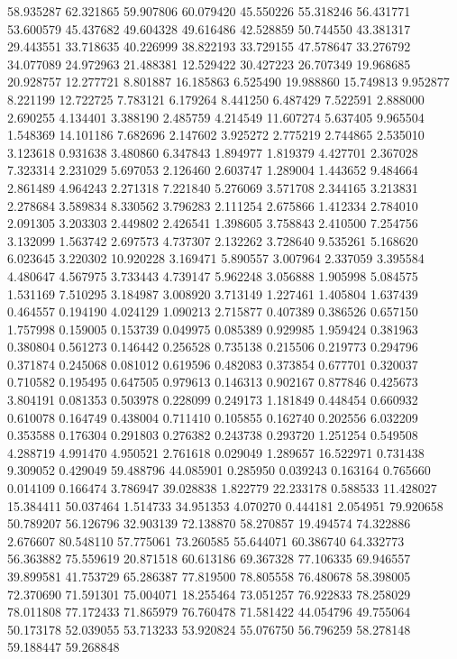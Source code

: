 58.935287
62.321865
59.907806
60.079420
45.550226
55.318246
56.431771
53.600579
45.437682
49.604328
49.616486
42.528859
50.744550
43.381317
29.443551
33.718635
40.226999
38.822193
33.729155
47.578647
33.276792
34.077089
24.972963
21.488381
12.529422
30.427223
26.707349
19.968685
20.928757
12.277721
8.801887
16.185863
6.525490
19.988860
15.749813
9.952877
8.221199
12.722725
7.783121
6.179264
8.441250
6.487429
7.522591
2.888000
2.690255
4.134401
3.388190
2.485759
4.214549
11.607274
5.637405
9.965504
1.548369
14.101186
7.682696
2.147602
3.925272
2.775219
2.744865
2.535010
3.123618
0.931638
3.480860
6.347843
1.894977
1.819379
4.427701
2.367028
7.323314
2.231029
5.697053
2.126460
2.603747
1.289004
1.443652
9.484664
2.861489
4.964243
2.271318
7.221840
5.276069
3.571708
2.344165
3.213831
2.278684
3.589834
8.330562
3.796283
2.111254
2.675866
1.412334
2.784010
2.091305
3.203303
2.449802
2.426541
1.398605
3.758843
2.410500
7.254756
3.132099
1.563742
2.697573
4.737307
2.132262
3.728640
9.535261
5.168620
6.023645
3.220302
10.920228
3.169471
5.890557
3.007964
2.337059
3.395584
4.480647
4.567975
3.733443
4.739147
5.962248
3.056888
1.905998
5.084575
1.531169
7.510295
3.184987
3.008920
3.713149
1.227461
1.405804
1.637439
0.464557
0.194190
4.024129
1.090213
2.715877
0.407389
0.386526
0.657150
1.757998
0.159005
0.153739
0.049975
0.085389
0.929985
1.959424
0.381963
0.380804
0.561273
0.146442
0.256528
0.735138
0.215506
0.219773
0.294796
0.371874
0.245068
0.081012
0.619596
0.482083
0.373854
0.677701
0.320037
0.710582
0.195495
0.647505
0.979613
0.146313
0.902167
0.877846
0.425673
3.804191
0.081353
0.503978
0.228099
0.249173
1.181849
0.448454
0.660932
0.610078
0.164749
0.438004
0.711410
0.105855
0.162740
0.202556
6.032209
0.353588
0.176304
0.291803
0.276382
0.243738
0.293720
1.251254
0.549508
4.288719
4.991470
4.950521
2.761618
0.029049
1.289657
16.522971
0.731438
9.309052
0.429049
59.488796
44.085901
0.285950
0.039243
0.163164
0.765660
0.014109
0.166474
3.786947
39.028838
1.822779
22.233178
0.588533
11.428027
15.384411
50.037464
1.514733
34.951353
4.070270
0.444181
2.054951
79.920658
50.789207
56.126796
32.903139
72.138870
58.270857
19.494574
74.322886
2.676607
80.548110
57.775061
73.260585
55.644071
60.386740
64.332773
56.363882
75.559619
20.871518
60.613186
69.367328
77.106335
69.946557
39.899581
41.753729
65.286387
77.819500
78.805558
76.480678
58.398005
72.370690
71.591301
75.004071
18.255464
73.051257
76.922833
78.258029
78.011808
77.172433
71.865979
76.760478
71.581422
44.054796
49.755064
50.173178
52.039055
53.713233
53.920824
55.076750
56.796259
58.278148
59.188447
59.268848
